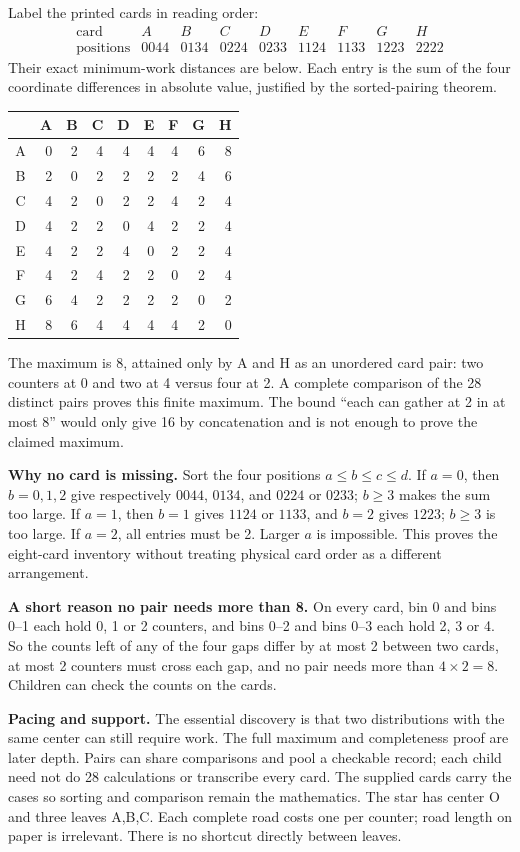 Label the printed cards in reading order:
\[
\begin{array}{c|cccccccc}
\text{card}&A&B&C&D&E&F&G&H\\\hline
\text{positions}&0044&0134&0224&0233&1124&1133&1223&2222
\end{array}
\]
Their exact minimum-work distances are below. Each entry is the sum of the four coordinate differences in absolute value, justified by the sorted-pairing theorem.
\begin{center}\renewcommand{\arraystretch}{1.25}
\begin{tabular}{c|rrrrrrrr}
 &A&B&C&D&E&F&G&H\\\hline
A&0&2&4&4&4&4&6&8\\
B&2&0&2&2&2&2&4&6\\
C&4&2&0&2&2&4&2&4\\
D&4&2&2&0&4&2&2&4\\
E&4&2&2&4&0&2&2&4\\
F&4&2&4&2&2&0&2&4\\
G&6&4&2&2&2&2&0&2\\
H&8&6&4&4&4&4&2&0
\end{tabular}\end{center}
The maximum is 8, attained only by A and H as an unordered card pair: two counters at 0 and two at 4 versus four at 2. A complete comparison of the 28 distinct pairs proves this finite maximum. The bound ``each can gather at 2 in at most 8'' would only give 16 by concatenation and is not enough to prove the claimed maximum.

\textbf{Why no card is missing.} Sort the four positions $a\le b\le c\le d$. If $a=0$, then $b=0,1,2$ give respectively $0044$, $0134$, and $0224$ or $0233$; $b\ge3$ makes the sum too large. If $a=1$, then $b=1$ gives $1124$ or $1133$, and $b=2$ gives $1223$; $b\ge3$ is too large. If $a=2$, all entries must be 2. Larger $a$ is impossible. This proves the eight-card inventory without treating physical card order as a different arrangement.

\textbf{A short reason no pair needs more than 8.} On every card, bin 0 and bins 0--1 each hold 0, 1 or 2 counters, and bins 0--2 and bins 0--3 each hold 2, 3 or 4. So the counts left of any of the four gaps differ by at most 2 between two cards, at most 2 counters must cross each gap, and no pair needs more than $4\times2=8$. Children can check the counts on the cards.

\textbf{Pacing and support.} The essential discovery is that two distributions with the same center can still require work. The full maximum and completeness proof are later depth. Pairs can share comparisons and pool a checkable record; each child need not do 28 calculations or transcribe every card. The supplied cards carry the cases so sorting and comparison remain the mathematics.
\newpage
{}
The star has center O and three leaves A,B,C. Each complete road costs one per counter; road length on paper is irrelevant. There is no shortcut directly between leaves.

